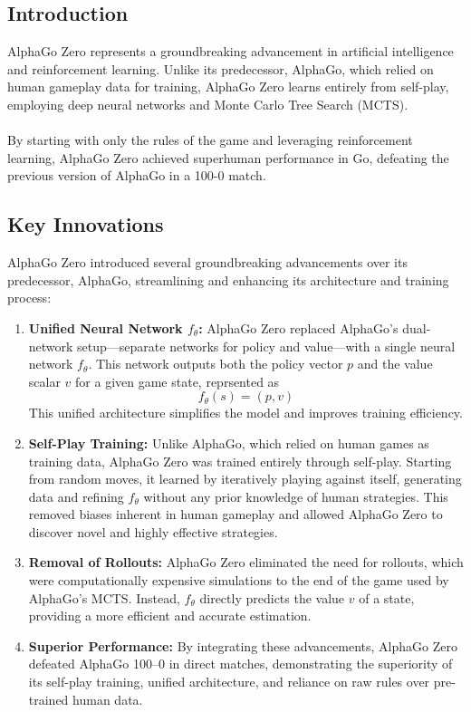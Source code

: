 \subsection{Introduction}
AlphaGo Zero represents a groundbreaking advancement in artificial intelligence and reinforcement learning. Unlike its predecessor, AlphaGo, which relied on human gameplay data for training, AlphaGo Zero learns entirely from self-play, employing deep neural networks and Monte Carlo Tree Search (MCTS). 
\\\\
By starting with only the rules of the game and leveraging reinforcement learning, AlphaGo Zero achieved superhuman performance in Go, defeating the previous version of AlphaGo in a 100-0 match.
\subsection{Key Innovations}

AlphaGo Zero introduced several groundbreaking advancements over its predecessor, AlphaGo, streamlining and enhancing its architecture and training process:

\begin{enumerate}
    \item \textbf{Unified Neural Network \( f_\theta \):}  
    AlphaGo Zero replaced AlphaGo's dual-network setup—separate networks for policy and value—with a single neural network \( f_\theta \). This network outputs both the policy vector \( p \) and the value scalar \( v \) for a given game state, reprsented as \[ f_\theta(s) = (p, v) \] This unified architecture simplifies the model and improves training efficiency.

    \item \textbf{Self-Play Training:}  
    Unlike AlphaGo, which relied on human games as training data, AlphaGo Zero was trained entirely through self-play. Starting from random moves, it learned by iteratively playing against itself, generating data and refining \( f_\theta \) without any prior knowledge of human strategies. This removed biases inherent in human gameplay and allowed AlphaGo Zero to discover novel and highly effective strategies.

    \item \textbf{Removal of Rollouts:}  
    AlphaGo Zero eliminated the need for rollouts, which were computationally expensive simulations to the end of the game used by AlphaGo's MCTS. Instead, \( f_\theta \) directly predicts the value \( v \) of a state, providing a more efficient and accurate estimation.


    \item \textbf{Superior Performance:}  
    By integrating these advancements, AlphaGo Zero defeated AlphaGo 100–0 in direct matches, demonstrating the superiority of its self-play training, unified architecture, and reliance on raw rules over pre-trained human data.
\end{enumerate}


